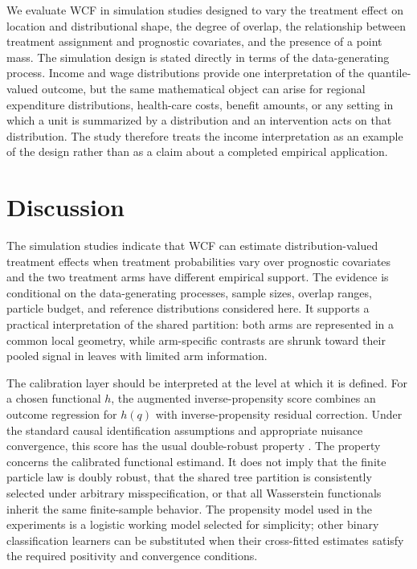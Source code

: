 We evaluate WCF in simulation studies designed to vary the treatment effect on location and distributional shape, the degree of overlap, the relationship between treatment assignment and prognostic covariates, and the presence of a point mass. The simulation design is stated directly in terms of the data-generating process. Income and wage distributions provide one interpretation of the quantile-valued outcome, but the same mathematical object can arise for regional expenditure distributions, health-care costs, benefit amounts, or any setting in which a unit is summarized by a distribution and an intervention acts on that distribution. The study therefore treats the income interpretation as an example of the design rather than as a claim about a completed empirical application.

\section{Discussion}

The simulation studies indicate that WCF can estimate distribution-valued treatment effects when treatment probabilities vary over prognostic covariates and the two treatment arms have different empirical support. The evidence is conditional on the data-generating processes, sample sizes, overlap ranges, particle budget, and reference distributions considered here. It supports a practical interpretation of the shared partition: both arms are represented in a common local geometry, while arm-specific contrasts are shrunk toward their pooled signal in leaves with limited arm information.

The calibration layer should be interpreted at the level at which it is defined. For a chosen functional $h$, the augmented inverse-propensity score combines an outcome regression for $h(q)$ with inverse-propensity residual correction. Under the standard causal identification assumptions and appropriate nuisance convergence, this score has the usual double-robust property \citep{bang2005doubly,chernozhukov2018double}. The property concerns the calibrated functional estimand. It does not imply that the finite particle law is doubly robust, that the shared tree partition is consistently selected under arbitrary misspecification, or that all Wasserstein functionals inherit the same finite-sample behavior. The propensity model used in the experiments is a logistic working model selected for simplicity; other binary classification learners can be substituted when their cross-fitted estimates satisfy the required positivity and convergence conditions.

